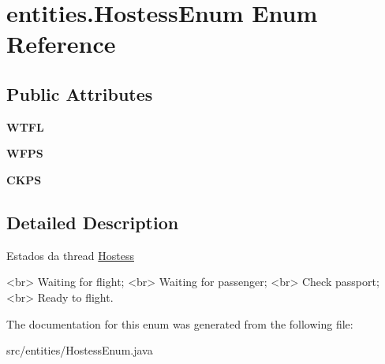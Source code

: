 \hypertarget{enumentities_1_1_hostess_enum}{}\section{entities.\+Hostess\+Enum Enum Reference}
\label{enumentities_1_1_hostess_enum}
\subsection*{Public Attributes}
\begin{DoxyCompactItemize}
\item 
\mbox{\label{enumentities_1_1_hostess_enum_a01812c97c05d14294edfd377744a1b0d}} 
{\bfseries W\+T\+FL}
\item 
\mbox{\label{enumentities_1_1_hostess_enum_a7dd1a5f1d4e0b7db465569db96495372}} 
{\bfseries W\+F\+PS}
\item 
\mbox{\label{enumentities_1_1_hostess_enum_a1e448e74ddf0ddaad9f27e2052a8e50f}} 
{\bfseries C\+K\+PS}
\end{DoxyCompactItemize}


\subsection{Detailed Description}
Estados da thread \hyperlink{classentities_1_1_hostess}{Hostess} \begin{DoxyVerb}<br> Waiting for flight;
<br> Waiting for passenger;
<br> Check passport;
<br> Ready to flight.\end{DoxyVerb}
 

The documentation for this enum was generated from the following file\+:\begin{DoxyCompactItemize}
\item 
src/entities/Hostess\+Enum.\+java\end{DoxyCompactItemize}
